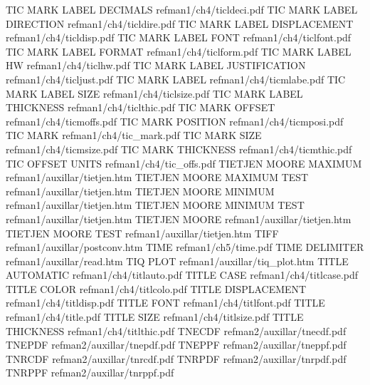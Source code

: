 TIC MARK LABEL DECIMALS                 refman1/ch4/ticldeci.pdf
TIC MARK LABEL DIRECTION                refman1/ch4/ticldire.pdf
TIC MARK LABEL DISPLACEMENT             refman1/ch4/ticldisp.pdf
TIC MARK LABEL FONT                     refman1/ch4/ticlfont.pdf
TIC MARK LABEL FORMAT                   refman1/ch4/ticlform.pdf
TIC MARK LABEL HW                       refman1/ch4/ticlhw.pdf
TIC MARK LABEL JUSTIFICATION            refman1/ch4/ticljust.pdf
TIC MARK LABEL                          refman1/ch4/ticmlabe.pdf
TIC MARK LABEL SIZE                     refman1/ch4/ticlsize.pdf
TIC MARK LABEL THICKNESS                refman1/ch4/ticlthic.pdf
TIC MARK OFFSET                         refman1/ch4/ticmoffs.pdf
TIC MARK POSITION                       refman1/ch4/ticmposi.pdf
TIC MARK                                refman1/ch4/tic_mark.pdf
TIC MARK SIZE                           refman1/ch4/ticmsize.pdf
TIC MARK THICKNESS                      refman1/ch4/ticmthic.pdf
TIC OFFSET UNITS                        refman1/ch4/tic_offs.pdf
TIETJEN MOORE MAXIMUM                   refman1/auxillar/tietjen.htm
TIETJEN MOORE MAXIMUM TEST              refman1/auxillar/tietjen.htm
TIETJEN MOORE MINIMUM                   refman1/auxillar/tietjen.htm
TIETJEN MOORE MINIMUM TEST              refman1/auxillar/tietjen.htm
TIETJEN MOORE                           refman1/auxillar/tietjen.htm
TIETJEN MOORE TEST                      refman1/auxillar/tietjen.htm
TIFF                                    refman1/auxillar/postconv.htm
TIME                                    refman1/ch5/time.pdf
TIME DELIMITER                          refman1/auxillar/read.htm
TIQ PLOT                                refman1/auxillar/tiq_plot.htm
TITLE AUTOMATIC                         refman1/ch4/titlauto.pdf
TITLE CASE                              refman1/ch4/titlcase.pdf
TITLE COLOR                             refman1/ch4/titlcolo.pdf
TITLE DISPLACEMENT                      refman1/ch4/titldisp.pdf
TITLE FONT                              refman1/ch4/titlfont.pdf
TITLE                                   refman1/ch4/title.pdf
TITLE SIZE                              refman1/ch4/titlsize.pdf
TITLE THICKNESS                         refman1/ch4/titlthic.pdf
TNECDF                                  refman2/auxillar/tnecdf.pdf
TNEPDF                                  refman2/auxillar/tnepdf.pdf
TNEPPF                                  refman2/auxillar/tneppf.pdf
TNRCDF                                  refman2/auxillar/tnrcdf.pdf
TNRPDF                                  refman2/auxillar/tnrpdf.pdf
TNRPPF                                  refman2/auxillar/tnrppf.pdf
